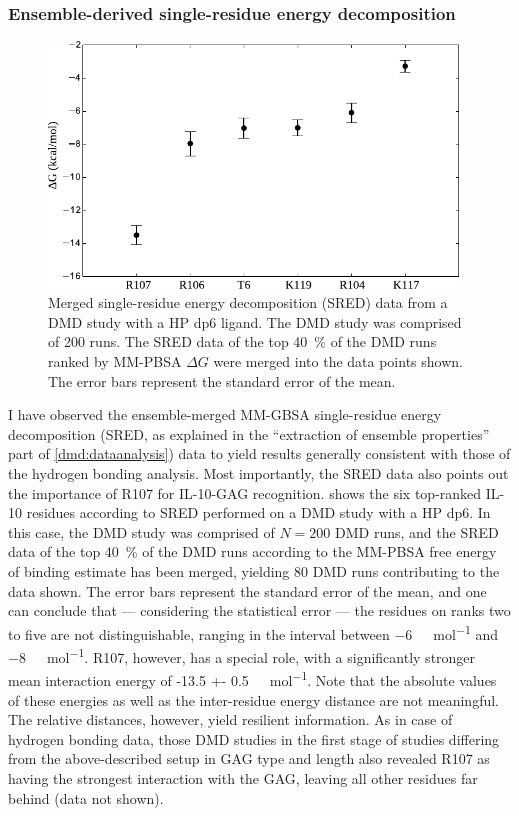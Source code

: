 \subsubsection{Ensemble-derived single-residue energy decomposition}

\begin{figure}
\centering
\includegraphics[width=0.97\textwidth]{gfx/dmdil10/round1_il10_SRED_hpdp6.pdf}
\caption[]{Merged single-residue energy decomposition (SRED) data from a
DMD study with a HP dp6 ligand. The DMD study was comprised of 200 runs. The
SRED data of the top \SI{40}{\percent} of the DMD runs ranked by MM-PBSA
$\Delta G$ were merged into the data points shown. The error bars represent the
standard error of the mean.}
\label{fig:dmdil10:SRED_hpdp6}
\end{figure}

I have observed the ensemble-merged MM-GBSA single-residue energy decomposition
(SRED, as explained in the \enquote{extraction of ensemble properties} part of
\cref{dmd:dataanalysis}) data to yield results generally consistent with those
of the hydrogen bonding analysis. Most importantly, the SRED data also points
out the importance of R107 for IL-10-GAG recognition.
 shows the six top-ranked IL-10 residues according
to SRED performed on a DMD study with a HP dp6. In this case, the DMD study was
comprised of $N=200$ DMD runs, and the SRED data of the top \SI{40}{\percent} of
the DMD runs according to the MM-PBSA free energy of binding estimate has been
merged, yielding 80 DMD runs contributing to the data shown. The error bars
represent the standard error of the mean, and one can conclude that ---
considering the statistical error --- the residues on ranks two to five are not
distinguishable, ranging in the interval between \SI{-6}{\kilo\calory\per\mol}
and \SI{-8}{\kilo\calory\per\mol}. R107, however, has a special role, with a
significantly stronger mean interaction energy of \SI{-13.5 +-
0.5}{\kilo\calory\per\mol}. Note that the absolute values of these energies as
well as the inter-residue energy distance are not meaningful. The relative
distances, however, yield resilient information. As in case of hydrogen bonding
data, those DMD studies in the first stage of studies differing from the
above-described setup in GAG type and length also revealed R107 as having the
strongest interaction with the GAG, leaving all other residues far behind (data
not shown).

